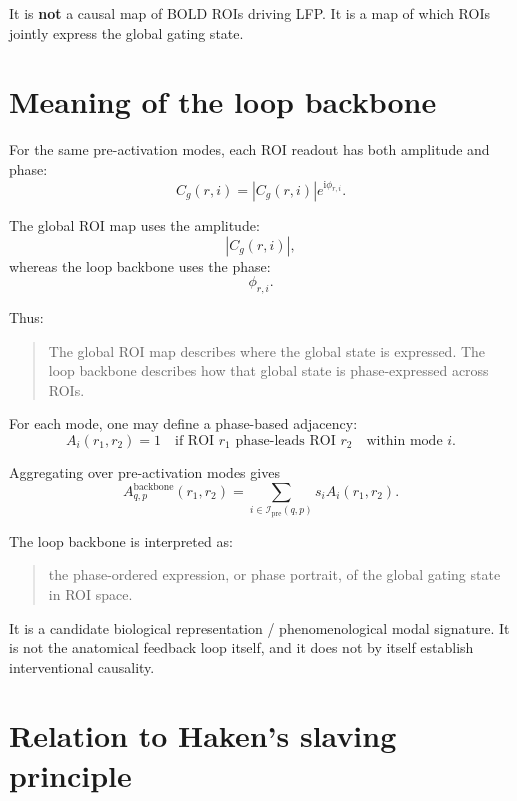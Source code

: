 \documentclass[11pt,a4paper]{article}
\begin{document}
It is \textbf{not} a causal map of BOLD ROIs driving LFP. It is a map of which ROIs jointly express the global gating state.

\section{Meaning of the loop backbone}

For the same pre-activation modes, each ROI readout has both amplitude and phase:
\begin{equation}
    C_g(r,i)=|C_g(r,i)|e^{\mathrm{i}\phi_{r,i}}.
\end{equation}

The global ROI map uses the amplitude:
\begin{equation}
    |C_g(r,i)|,
\end{equation}
whereas the loop backbone uses the phase:
\begin{equation}
    \phi_{r,i}.
\end{equation}

Thus:
\begin{quote}
The global ROI map describes where the global state is expressed. The loop backbone describes how that global state is phase-expressed across ROIs.
\end{quote}

For each mode, one may define a phase-based adjacency:
\begin{equation}
A_i(r_1,r_2)=1
\quad \text{if ROI } r_1 \text{ phase-leads ROI } r_2
\quad \text{within mode } i.
\end{equation}

Aggregating over pre-activation modes gives
\begin{equation}
A_{q,p}^{\mathrm{backbone}}(r_1,r_2)
=
\sum_{i\in\mathcal I_{\mathrm{pre}}(q,p)} s_i A_i(r_1,r_2).
\end{equation}

The loop backbone is interpreted as:
\begin{quote}
the phase-ordered expression, or phase portrait, of the global gating state in ROI space.
\end{quote}

It is a candidate biological representation / phenomenological modal signature. It is not the anatomical feedback loop itself, and it does not by itself establish interventional causality.

\section{Relation to Haken's slaving principle}
\end{document}
